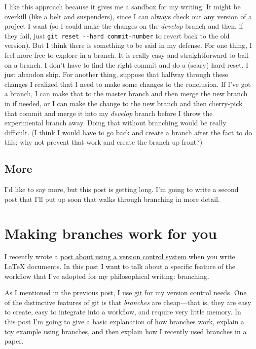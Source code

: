 \documentclass{article}
\begin{document}
I like this approach because it gives me a sandbox for my writing.
It might be overkill (like a belt and suspenders), since I can
always check out any version of a project I want (so I could make
the changes on the \emph{develop} branch and then, if they fail,
just \verb!git reset --hard commit-number! to revert back to the
old version). But I think there is something to be said in my
defense. For one thing, I feel more free to explore in a branch. It
is really easy and straightforward to bail on a branch. I don't
have to find the right commit and do a (scary) hard reset. I just
abandon ship. For another thing, suppose that halfway through these
changes I realized that I need to make some changes to the
conclusion. If I've got a branch, I can make that to the master
branch and then merge the new branch in if needed, or I can make
the change to the new branch and then cherry-pick that commit and
merge it into my \emph{develop} branch before I throw the
experimental branch away. Doing that without branching would be
really difficult. (I think I would have to go back and create a
branch after the fact to do this; why not prevent that work and
create the branch up front?)

\subsection{More}

I'd like to say more, but this post is getting long. I'm going to
write a second post that I'll put up soon that walks through
branching in more detail.

\section{Making branches work for you}

I recently wrote a
\href{http://www.charlietanksley.net/philtex/using-a-version-control-system/}{post about using a version control system}
when you write LaTeX documents. In this post I want to talk about a
specific feature of the workflow that I've adopted for my
philosophical writing: branching.

As I mentioned in the previous post, I use
\href{http://git-scm.com/}{git} for my version control needs. One
of the distinctive features of git is that \emph{branches} are
cheap—that is, they are easy to create, easy to integrate into a
workflow, and require very little memory. In this post I'm going to
give a basic explanation of how branches work, explain a toy
example using branches, and then explain how I recently used
branches in a paper.
\end{document}
